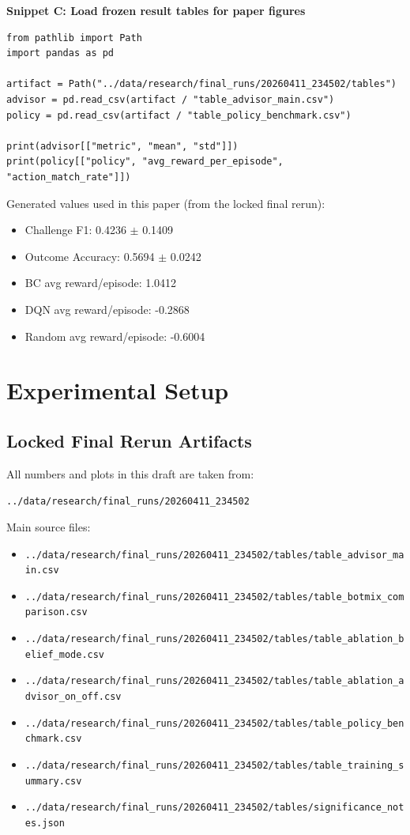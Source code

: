 \documentclass[11pt]{article}
\newcommand{\artifactdirtext}{../data/research/final\_runs/20260411\_234502}
\begin{document}
\vspace{2.0em}

\textbf{Snippet C: Load frozen result tables for paper figures}
\begin{verbatim}
from pathlib import Path
import pandas as pd

artifact = Path("../data/research/final_runs/20260411_234502/tables")
advisor = pd.read_csv(artifact / "table_advisor_main.csv")
policy = pd.read_csv(artifact / "table_policy_benchmark.csv")

print(advisor[["metric", "mean", "std"]])
print(policy[["policy", "avg_reward_per_episode", "action_match_rate"]])
\end{verbatim}

Generated values used in this paper (from the locked final rerun):
\begin{itemize}
  \item Challenge F1: 0.4236 $\pm$ 0.1409
  \item Outcome Accuracy: 0.5694 $\pm$ 0.0242
  \item BC avg reward/episode: 1.0412
  \item DQN avg reward/episode: -0.2868
  \item Random avg reward/episode: -0.6004
\end{itemize}

\section{Experimental Setup}
\subsection{Locked Final Rerun Artifacts}
All numbers and plots in this draft are taken from:
\begin{center}
\texttt{\artifactdirtext}
\end{center}

Main source files:
\begin{itemize}
  \item \texttt{\artifactdirtext/tables/table\_advisor\_main.csv}
  \item \texttt{\artifactdirtext/tables/table\_botmix\_comparison.csv}
  \item \texttt{\artifactdirtext/tables/table\_ablation\_belief\_mode.csv}
  \item \texttt{\artifactdirtext/tables/table\_ablation\_advisor\_on\_off.csv}
  \item \texttt{\artifactdirtext/tables/table\_policy\_benchmark.csv}
  \item \texttt{\artifactdirtext/tables/table\_training\_summary.csv}
  \item \texttt{\artifactdirtext/tables/significance\_notes.json}
\end{itemize}
\end{document}
